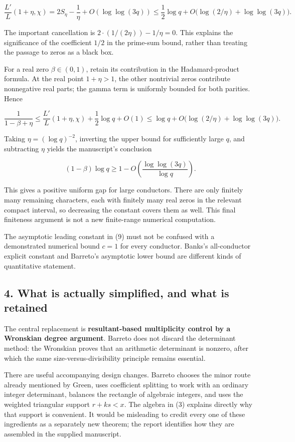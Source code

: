 \documentclass[11pt]{article}
\begin{document}
\[
\frac{L'}{L}(1+\eta,\chi)
=2S_\eta-\frac1\eta+O(\log\log(3q))
\le\frac12\log q+O\bigl(\log(2/\eta)+\log\log(3q)\bigr).
\tag{7}
\]

The important cancellation is \(2\cdot(1/(2\eta))-1/\eta=0\). This explains the significance of the coefficient \(1/2\) in the prime-sum bound, rather than treating the passage to zeros as a black box.

For a real zero \(\beta\in(0,1)\), retain its contribution in the Hadamard-product formula. At the real point \(1+\eta>1\), the other nontrivial zeros contribute nonnegative real parts; the gamma term is uniformly bounded for both parities. Hence

\[
\frac{1}{1-\beta+\eta}
\le\frac{L'}{L}(1+\eta,\chi)+\frac12\log q+O(1)
\le\log q+O\bigl(\log(2/\eta)+\log\log(3q)\bigr).
\tag{8}
\]

Taking \(\eta=(\log q)^{-2}\), inverting the upper bound for sufficiently large \(q\), and subtracting \(\eta\) yields the manuscript's conclusion

\[
(1-\beta)\log q
\ge1-O\!\left(\frac{\log\log(3q)}{\log q}\right).
\tag{9}
\]

This gives a positive uniform gap for large conductors. There are only finitely many remaining characters, each with finitely many real zeros in the relevant compact interval, so decreasing the constant covers them as well. This final finiteness argument is not a new finite-range numerical computation.

The asymptotic leading constant in (9) must not be confused with a demonstrated numerical bound \(c=1\) for every conductor. Banks's all-conductor explicit constant and Barreto's asymptotic lower bound are different kinds of quantitative statement.

\subsection{4. What is actually simplified, and what is retained}\label{what-is-actually-simplified-and-what-is-retained}

The central replacement is \textbf{resultant-based multiplicity control by a Wronskian degree argument}. Barreto does not discard the determinant method: the Wronskian proves that an arithmetic determinant is nonzero, after which the same size-versus-divisibility principle remains essential.

There are useful accompanying design changes. Barreto chooses the minor route already mentioned by Green, uses coefficient splitting to work with an ordinary integer determinant, balances the rectangle of algebraic integers, and uses the weighted triangular support \(r+ks<x\). The algebra in (3) explains directly why that support is convenient. It would be misleading to credit every one of these ingredients as a separately new theorem; the report identifies how they are assembled in the supplied manuscript.
\end{document}
